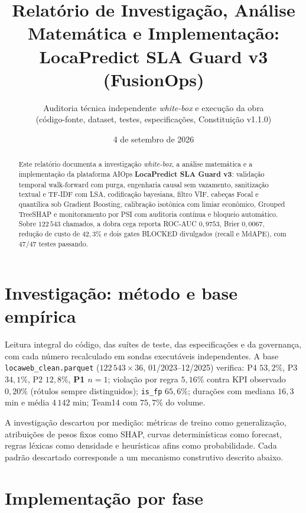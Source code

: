 \documentclass[11pt,a4paper]{article}
\title{Relatório de Investigação, Análise Matemática e Implementação:\\ LocaPredict SLA Guard v3 (FusionOps)}
\author{Auditoria técnica independente \emph{white-box} e execução da obra \\ (código-fonte, dataset, testes, especificações, Constituição v1.1.0)}
\date{4 de setembro de 2026}
\begin{document}
\maketitle

\begin{abstract}
Este relatório documenta a investigação \emph{white-box}, a análise
matemática e a implementação da plataforma AIOps \textbf{LocaPredict SLA Guard
v3}: validação temporal walk-forward com purga, engenharia causal sem
vazamento, sanitização textual e TF-IDF com LSA, codificação bayesiana, filtro
VIF, cabeças Focal e quantílica sob Gradient Boosting, calibração isotônica
com limiar econômico, Grouped TreeSHAP e monitoramento por PSI com auditoria
contínua e bloqueio automático. Sobre $122\,543$ chamados, a dobra cega
reporta ROC-AUC $0{,}9753$, Brier $0{,}0067$, redução de custo de $42{,}3\%$ e
dois gates BLOCKED divulgados (recall e MdAPE), com 47/47 testes passando.
\end{abstract}

\tableofcontents
\newpage

\section{Investigação: método e base empírica}

Leitura integral do código, das suítes de teste, das especificações e da
governança, com cada número recalculado em sondas executáveis independentes.
A base \texttt{locaweb\_clean.parquet} ($122\,543\times36$, 01/2023--12/2025)
verifica: P4 $53{,}2\%$, P3 $34{,}1\%$, P2 $12{,}8\%$, \textbf{P1 $n=1$};
violação por regra $5{,}16\%$ contra KPI observado $0{,}20\%$ (rótulos sempre
distinguidos); \texttt{is\_fp} $65{,}6\%$; durações com mediana $16{,}3$ min e
média $4\,142$ min; Team14 com $75{,}7\%$ do volume.

A investigação descartou por medição: métricas de treino como generalização,
atribuições de pesos fixos como SHAP, curvas determinísticas como forecast,
regras léxicas como densidade e heurísticas afins como probabilidade. Cada
padrão descartado corresponde a um mecanismo construtivo descrito abaixo.

\section{Implementação por fase}
\end{document}
